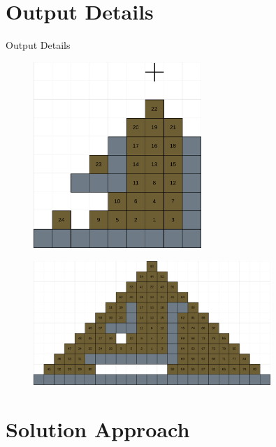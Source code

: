 \documentclass{beamer}
\begin{document}
\section{Output Details}

\begin{frame}{Output Details}
    \begin{minipage}[c]{0.4\textwidth}
        \begin{figure}[H]
            \centering
            \includegraphics[width=0.565\textwidth]{Images/AoC22_14_solution_part_1.png}
        \end{figure}
    \end{minipage}%
    \begin{minipage}[c]{0.6\textwidth}
        \begin{figure}[H]
            \centering
            \includegraphics[width=0.8\textwidth]{Images/AoC22_14_solution_part_2.png}
        \end{figure}
    \end{minipage}
\end{frame}
\section{Solution Approach}
\end{document}
